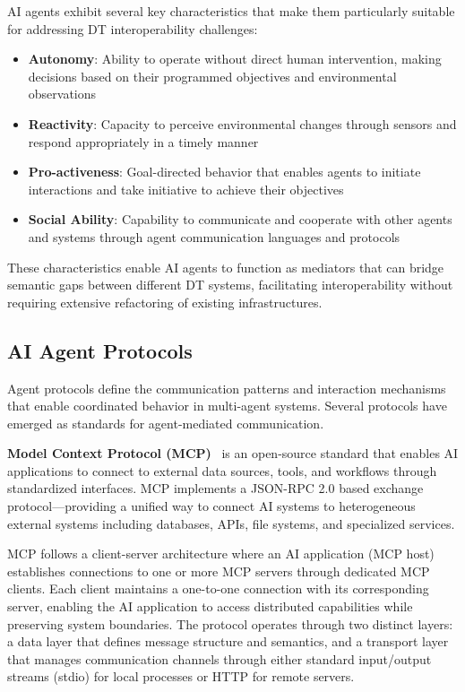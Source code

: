 AI agents exhibit several key characteristics that make them particularly suitable for addressing DT interoperability challenges:
\begin{itemize}
    \item \textbf{Autonomy}:
    Ability to operate without direct human intervention,
        making decisions based on their programmed objectives and environmental observations
    \item \textbf{Reactivity}:
    Capacity to perceive environmental changes through
        sensors and respond appropriately in a timely manner
    \item \textbf{Pro-activeness}:
    Goal-directed behavior that enables agents to initiate interactions and
        take initiative to achieve their objectives
    \item \textbf{Social Ability}:
    Capability to communicate and cooperate with other agents and systems
        through agent communication languages and protocols
\end{itemize}

These characteristics enable AI agents to function as
    mediators that can bridge semantic gaps between different DT systems,
    facilitating interoperability without requiring extensive refactoring of existing infrastructures.

\subsection{AI Agent Protocols}
\label{subsec:ai-agent-protocols}

Agent protocols define the communication patterns and interaction mechanisms that enable coordinated behavior in multi-agent systems.
Several protocols have emerged as standards for agent-mediated communication.

\textbf{Model Context Protocol (MCP)}~\cite{Anthropic_2024}
    is an open-source standard that enables AI applications to
    connect to external data sources, tools, and workflows through
    standardized interfaces.
MCP implements a JSON-RPC 2.0 based exchange protocol—providing a unified way to
    connect AI systems to heterogeneous external systems including 
    databases, APIs, file systems, and specialized services.

MCP follows a client-server architecture where
    an AI application (MCP host) establishes connections to one or more MCP servers through dedicated MCP clients.
Each client maintains a one-to-one connection with its corresponding server, enabling the AI application to
    access distributed capabilities while preserving system boundaries.
The protocol operates through two distinct layers:
    a data layer that defines message structure and semantics, and
    a transport layer that manages communication channels through either standard input/output streams (stdio) for local processes or HTTP for remote servers.

